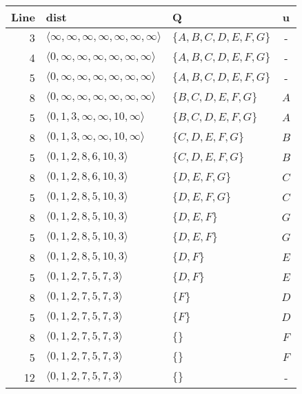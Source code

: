 {\begin{center} \begin{tabular}{r | l l c}
    \textbf{Line} & \textbf{dist} & \textbf{Q} & \textbf{u}\\ \hline
    3             & $\langle \infty, \infty, \infty, \infty, \infty, \infty, \infty \rangle$ & $\{A,B,C,D,E,F,G\}$ & - \\
    4             & $\langle 0, \infty, \infty, \infty, \infty, \infty, \infty \rangle$ & $\{A,B,C,D,E,F,G\}$ & - \\
    5             & $\langle 0, \infty, \infty, \infty, \infty, \infty, \infty \rangle$ & $\{A,B,C,D,E,F,G\}$ & - \\
    8             & $\langle 0, \infty, \infty, \infty, \infty, \infty, \infty \rangle$ & $\{B,C,D,E,F,G\}$ & $A$ \\
    5             & $\langle 0, 1, 3, \infty, \infty, 10, \infty \rangle$ & $\{B,C,D,E,F,G\}$ & $A$ \\
    8             & $\langle 0, 1, 3, \infty, \infty, 10, \infty \rangle$ & $\{C,D,E,F,G\}$ & $B$ \\
    5             & $\langle 0, 1, 2, 8, 6, 10, 3 \rangle$ & $\{C,D,E,F,G\}$ & $B$ \\
    8             & $\langle 0, 1, 2, 8, 6, 10, 3 \rangle$ & $\{D,E,F,G\}$ & $C$ \\
    5             & $\langle 0, 1, 2, 8, 5, 10, 3 \rangle$ & $\{D,E,F,G\}$ & $C$ \\
    8             & $\langle 0, 1, 2, 8, 5, 10, 3 \rangle$ & $\{D,E,F\}$ & $G$ \\
    5             & $\langle 0, 1, 2, 8, 5, 10, 3 \rangle$ & $\{D,E,F\}$ & $G$ \\
    8             & $\langle 0, 1, 2, 8, 5, 10, 3 \rangle$ & $\{D,F\}$ & $E$ \\
    5             & $\langle 0, 1, 2, 7, 5, 7, 3 \rangle$ & $\{D,F\}$ & $E$ \\
    8             & $\langle 0, 1, 2, 7, 5, 7, 3 \rangle$ & $\{F\}$ & $D$ \\
    5             & $\langle 0, 1, 2, 7, 5, 7, 3 \rangle$ & $\{F\}$ & $D$ \\
    8             & $\langle 0, 1, 2, 7, 5, 7, 3 \rangle$ & $\{\}$ & $F$ \\
    5             & $\langle 0, 1, 2, 7, 5, 7, 3 \rangle$ & $\{\}$ & $F$ \\
    12            & $\langle 0, 1, 2, 7, 5, 7, 3 \rangle$ & $\{\}$ & -
\end{tabular} \end{center}

}
